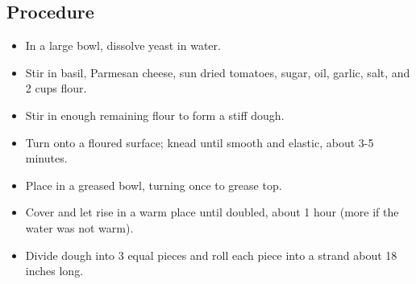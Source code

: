 \documentclass[10pt, openany]{book}
\begin{document}
\subsection{Procedure}
\begin{itemize}
  \item In a large bowl, dissolve yeast in water.
  \item Stir in basil, Parmesan cheese, sun dried tomatoes, sugar, oil, garlic, salt, and 2 cups flour.
  \item Stir in enough remaining flour to form a stiff dough.
  \item Turn onto a floured surface; knead until smooth and elastic, about 3-5 minutes.
  \item Place in a greased bowl, turning once to grease top.
  \item Cover and let rise in a warm place until doubled, about 1 hour (more if the water was not warm).
  \item Divide dough into 3 equal pieces and roll each piece into a strand about 18 inches long.
\end{itemize}
\end{document}
